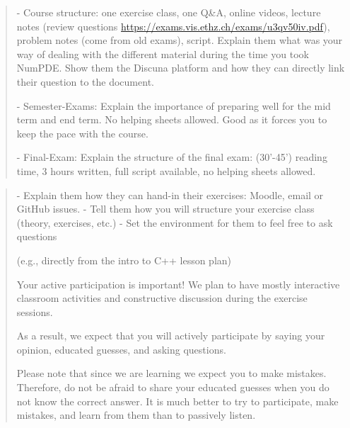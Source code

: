 

\begin{quote}
    - Course structure: one exercise class, one Q\&A, online videos, lecture notes (review questions \url{https://exams.vis.ethz.ch/exams/u3qv50iv.pdf}), problem notes (come from old exams), script. Explain them what was your way of dealing with the different material during the time you took NumPDE. Show them the Discuna platform and how they can directly link their question to the document.
    
    - Semester-Exams: Explain the importance of preparing well for the mid term and end term. No helping sheets allowed. Good as it forces you to keep the pace with the course.
    
    - Final-Exam: Explain the structure of the final exam: (30'-45') reading time, 3 hours written, full script available, no helping sheets allowed.
\end{quote}

\quest


\begin{quote}
    - Explain them how they can hand-in their exercises: Moodle, email or GitHub issues.
    - Tell them how you will structure your exercise class (theory, exercises, etc.)
    - Set the environment for them to feel free to ask questions
    
    (e.g., directly from the intro to C++ lesson plan)

    Your active participation is important! We plan to have mostly
    interactive classroom activities and constructive discussion during
    the exercise sessions.

    As a result, we expect that you will actively participate by saying
    your opinion, educated guesses, and asking questions.

    Please note that since we are learning we expect you to make
    mistakes. Therefore, do not be afraid to share your educated guesses
    when you do not know the correct answer. It is much better to try to
    participate, make mistakes, and learn from them than to passively
    listen.
\end{quote}

\quest



